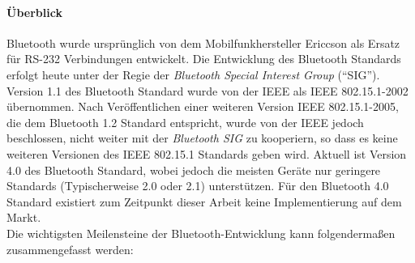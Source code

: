             \paragraph{Überblick}
                Bluetooth wurde ursprünglich von dem Mobilfunkhersteller Ericcson als Ersatz für
                RS-232 Verbindungen entwickelt. Die Entwicklung des Bluetooth Standards erfolgt
                heute unter der Regie der \textsl{Bluetooth Special Interest Group} ("`SIG"').
                Version 1.1 des Bluetooth Standard wurde 
                von der IEEE als IEEE 802.15.1-2002 übernommen. Nach Veröffentlichen einer
                weiteren Version IEEE 802.15.1-2005, die dem Bluetooth 1.2 Standard entspricht,
                wurde von der IEEE jedoch beschlossen, nicht weiter mit der \textsl{Bluetooth SIG}
                zu kooperiern, so dass es keine weiteren Versionen des IEEE 802.15.1 Standards 
                geben wird. Aktuell ist Version 4.0 des Bluetooth Standard, wobei jedoch die
                meisten Geräte nur geringere Standards (Typischerweise 2.0 oder 2.1) unterstützen.
                Für den Bluetooth 4.0 Standard existiert zum Zeitpunkt dieser Arbeit keine 
                Implementierung auf dem Markt.\\
                Die wichtigsten Meilensteine der Bluetooth-Entwicklung kann folgendermaßen
                zusammengefasst werden:

